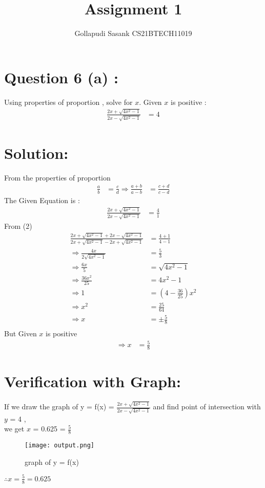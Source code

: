 \documentclass[twocolumn]{article}
\title{Assignment 1}
\author{Gollapudi Sasank CS21BTECH11019}
\begin{document}
\maketitle
\section*{ Question 6 (a) :}
\noindent Using properties of proportion , solve for $x$. Given $x$ is positive :
\begin{align}
\frac{2x+\sqrt{4x^2-1}}{2x-\sqrt{4x^2-1}} &= 4 
\end{align}
\section*{Solution:}
From the properties of proportion
\begin{align}
     \frac{a}{b}  &=  \frac{c}{d} 
     \Rightarrow 
     \frac{a+b}{a-b} &= \frac{c+d}{c-d}
     \end{align}
The Given Equation is :
    \begin{align}
        \frac{2x+\sqrt{4x^2-1}}{2x-\sqrt{4x^2-1}} &= \frac {4}{1}
        \end{align}
    From (2) 
    \begin{align}
      \frac {2x+\sqrt{4x^2-1}+2x-\sqrt{4x^2-1}}{2x+\sqrt{4x^2-1}-2x+\sqrt{4x^2-1}} &= \frac {4+1}{4-1} \\ \Rightarrow
        \frac{4x}{2\sqrt{4x^2-1}} &= \frac {5}{3} \\   \Rightarrow
        \frac{6x}{5} &= \sqrt{4x^2-1} \\  \Rightarrow
        \frac{36x^2}{25} &= 4x^2-1 \\   \Rightarrow
         1 &= (4 - \frac{36}{25})x^2 \\   \Rightarrow
        x^2 &=\frac{25}{64} \\   \Rightarrow
        x &= \pm\frac{5}{8} \\   
    \end{align}
But Given $x$ is positive 
\begin{align}
   \Rightarrow x &= \frac{5}{8}  
   \end{align}
\section*{Verification with Graph:} 
If we draw the graph of 
y = f(x) = $\frac{2x+\sqrt{4x^2-1}}{2x-\sqrt{4x^2-1}}$
 and find point of intersection with $y$ = 4 ,\\ we get $x$ = 0.625 = $\frac{5}{8}$ \\    
\begin{figure}[h]  
\texttt{[image: output.png]}
\caption{graph of y = f(x)}
\end{figure}
$\therefore x = \frac{5}{8} = 0.625 $
\end{document}
